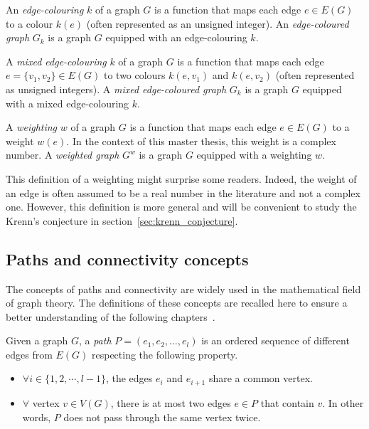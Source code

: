 \begin{definition}     %
    \label{def:edge_coloured_graph}
    An \textit{edge-colouring} $k$ of a graph $G$ is a function that maps each edge $e \in E(G)$ to a colour $k(e)$ (often represented as an unsigned integer).
    An \textit{edge-coloured graph} $G_k$ is a graph $G$ equipped with an edge-colouring $k$.
\end{definition}

\begin{definition}
    \label{def:mixed_edge_coloured_graph}
    A \textit{mixed edge-colouring} $k$ of a graph $G$ is a function that maps each edge $e = \{v_1, v_2\} \in E(G)$ to two colours $k(e, v_1)$ and $k(e, v_2)$ (often represented as unsigned integers).
    A \textit{mixed edge-coloured graph} $G_k$ is a graph $G$ equipped with a mixed edge-colouring $k$.
\end{definition}

\begin{definition}
    \label{def:weighted_graph}
    A \textit{weighting} $w$ of a graph $G$ is a function that maps each edge $e \in E(G)$ to a weight $w(e)$.
    In the context of this master thesis, this weight is a complex number.
    A \textit{weighted graph} $G^w$ is a graph $G$ equipped with a weighting $w$.
\end{definition}

This definition of a weighting might surprise some readers.
Indeed, the weight of an edge is often assumed to be a real number in the literature and not a complex one.
However, this definition is more general and will be convenient to study the Krenn's conjecture in section~\ref{sec:krenn_conjecture}.


\subsection{Paths and connectivity concepts}
\label{subsec:paths-and-connectivity-concepts}

The concepts of paths and connectivity are widely used in the mathematical field of graph theory.
The definitions of these concepts are recalled here to ensure a better understanding of the following chapters~\cite{bondy1976graph}.

\begin{definition}[Path]
    \label{def:path}
    Given a graph $G$, a \textit{path} $P = (e_1, e_2, \dots, e_l)$ is an ordered sequence of different edges from $E(G)$ respecting the following property.
    \begin{itemize}
        \item $\forall i \in \{1, 2, \cdots, l - 1\}$, the edges $e_i$ and $e_{i+1}$ share a common vertex.
        \item $\forall$ vertex $v \in V(G)$, there is at most two edges $e \in P$ that contain $v$.
            In other words, $P$ does not pass through the same vertex twice.
    \end{itemize}
\end{definition}

